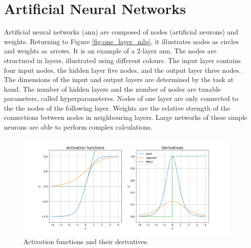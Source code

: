 \section{Artificial Neural Networks} \label{sec:artificial neural networks}
Artificial neural networks (\acrshort{ann}) are composed of nodes (artificial neurons) and weights. Returning to Figure \ref{fig:one_layer_mlp}, it illustrates nodes as circles and weights as arrows. It is an example of a 2-layer \acrshort{ann}. The nodes are structured in layers, illustrated using different colours. The input layer contains four input nodes, the hidden layer five nodes, and the output layer three nodes. The dimensions of the input and output layers are determined by the task at hand. The number of hidden layers and the number of nodes are tunable parameters, called hyperparameteres. Nodes of one layer are only connected to the the nodes of the following layer. Weights are the relative strength of the connections between nodes in neighbouring layers. Large networks of these simple neurons are able to perform complex calculations.

\begin{figure}
    \centering
    \includegraphics[scale = 0.4]{Chapter3_Method/figs/activation_functions_and_derivatives.png}
    \caption{Activation functions and their derivatives.}
    \label{fig:activation_function_example}
\end{figure}

